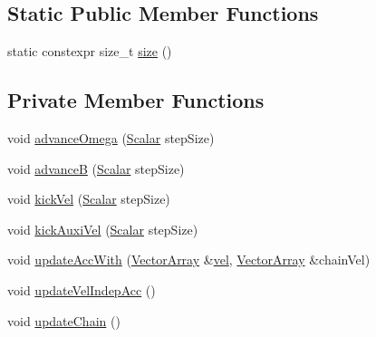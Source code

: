 \subsection*{Static Public Member Functions}
\begin{DoxyCompactItemize}
\item 
static constexpr size\+\_\+t \mbox{\hyperlink{class_a_rchain_ac612af46ce057d56dc47a6d28738a4cf}{size}} ()
\end{DoxyCompactItemize}
\subsection*{Private Member Functions}
\begin{DoxyCompactItemize}
\item 
void \mbox{\hyperlink{class_a_rchain_ac54722bde3c9a15e04dd004ebcf0db5e}{advance\+Omega}} (\mbox{\hyperlink{class_a_rchain_a707e42a79e4744424a34c9007e84ee07}{Scalar}} step\+Size)
\item 
void \mbox{\hyperlink{class_a_rchain_a1b2ae6231caeba3df20e4ab41f63a4b8}{advanceB}} (\mbox{\hyperlink{class_a_rchain_a707e42a79e4744424a34c9007e84ee07}{Scalar}} step\+Size)
\item 
void \mbox{\hyperlink{class_a_rchain_a0b073cd82321047d7fafda59cef998ef}{kick\+Vel}} (\mbox{\hyperlink{class_a_rchain_a707e42a79e4744424a34c9007e84ee07}{Scalar}} step\+Size)
\item 
void \mbox{\hyperlink{class_a_rchain_a53838a7890cee54c69786bda87dd6cd9}{kick\+Auxi\+Vel}} (\mbox{\hyperlink{class_a_rchain_a707e42a79e4744424a34c9007e84ee07}{Scalar}} step\+Size)
\item 
void \mbox{\hyperlink{class_a_rchain_a92865bff07dc16e3065a8f695120a5f5}{update\+Acc\+With}} (\mbox{\hyperlink{class_a_rchain_a019fbadb9f4e5892736d9127537338bb}{Vector\+Array}} \&\mbox{\hyperlink{classparticle_system_a545da170c4d59f18c6ddb18817cb5f3e}{vel}}, \mbox{\hyperlink{class_a_rchain_a019fbadb9f4e5892736d9127537338bb}{Vector\+Array}} \&chain\+Vel)
\item 
void \mbox{\hyperlink{class_a_rchain_a08ddf32fb537ac1556b2e4560abf3b5d}{update\+Vel\+Indep\+Acc}} ()
\item 
void \mbox{\hyperlink{class_a_rchain_ad576df000b6d9f3948eae2793c6b3c54}{update\+Chain}} ()
\end{DoxyCompactItemize}
